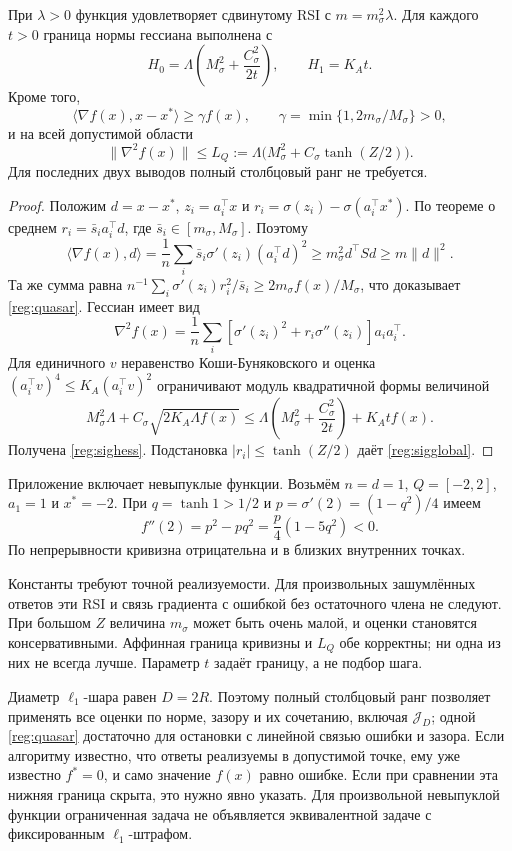 \begin{proposition}
\label{reg:sigmoidbounds}
При $\lambda>0$ функция удовлетворяет сдвинутому RSI с
$m=m_\sigma^2\lambda$. Для каждого $t>0$ граница нормы гессиана
выполнена с
\begin{equation}\label{reg:sighess}
 H_0=\Lambda\left(M_\sigma^2+\frac{C_\sigma^2}{2t}\right),
 \qquad H_1=K_A t.
\end{equation}
Кроме того,
\begin{equation}\label{reg:quasar}
 \langle\nabla f(x),x-x^*\rangle\ge\gamma f(x),\qquad
 \gamma=\min\{1,2m_\sigma/M_\sigma\}>0,
\end{equation}
и на всей допустимой области
\begin{equation}\label{reg:sigglobal}
 \|\nabla^2f(x)\|\le L_Q
 :=\Lambda\bigl(M_\sigma^2+C_\sigma\tanh(Z/2)\bigr).
\end{equation}
Для последних двух выводов полный столбцовый ранг не требуется.
\end{proposition}
\begin{proof}
Положим $d=x-x^*$, $z_i=a_i^\top x$ и
$r_i=\sigma(z_i)-\sigma(a_i^\top x^*)$.
По теореме о среднем $r_i=\bar s_i a_i^\top d$, где
$\bar s_i\in[m_\sigma,M_\sigma]$. Поэтому
\[
 \langle\nabla f(x),d\rangle
 =\frac1n\sum_i\bar s_i\sigma'(z_i)(a_i^\top d)^2
 \ge m_\sigma^2d^\top Sd\ge m\|d\|^2.
\]
Та же сумма равна
$n^{-1}\sum_i\sigma'(z_i)r_i^2/\bar s_i
 \ge 2m_\sigma f(x)/M_\sigma$, что доказывает \eqref{reg:quasar}.
Гессиан имеет вид
\[
 \nabla^2f(x)=\frac1n\sum_i
 [\sigma'(z_i)^2+r_i\sigma''(z_i)]a_i a_i^\top.
\]
Для единичного $v$ неравенство Коши-Буняковского и оценка
$(a_i^\top v)^4\le K_A(a_i^\top v)^2$ ограничивают модуль
квадратичной формы величиной
\[
 M_\sigma^2\Lambda+C_\sigma\sqrt{2K_A\Lambda f(x)}
 \le\Lambda\left(M_\sigma^2+\frac{C_\sigma^2}{2t}\right)+K_Atf(x).
\]
Получена \eqref{reg:sighess}. Подстановка
$|r_i|\le\tanh(Z/2)$ даёт \eqref{reg:sigglobal}.
\end{proof}

Приложение включает невыпуклые функции. Возьмём $n=d=1$,
$Q=[-2,2]$, $a_1=1$ и $x^*=-2$. При
$q=\tanh1>1/2$ и $p=\sigma'(2)=(1-q^2)/4$ имеем
\[
 f''(2)=p^2-pq^2=\frac p4(1-5q^2)<0.
\]
По непрерывности кривизна отрицательна и в близких внутренних точках.

Константы требуют точной реализуемости. Для произвольных зашумлённых
ответов эти RSI и связь градиента с ошибкой без остаточного члена
не следуют. При большом $Z$ величина $m_\sigma$ может быть очень
малой, и оценки становятся консервативными. Аффинная граница
кривизны и $L_Q$ обе корректны; ни одна из них не всегда лучше.
Параметр $t$ задаёт границу, а не подбор шага.

Диаметр $\ell_1$-шара равен $D=2R$. Поэтому полный столбцовый ранг
позволяет применять все оценки по норме, зазору и их сочетанию,
включая $\mathcal J_D$; одной \eqref{reg:quasar} достаточно для
остановки с линейной связью ошибки и зазора. Если алгоритму известно,
что ответы реализуемы в допустимой точке, ему уже известно $f^*=0$,
и само значение $f(x)$ равно ошибке. Если при сравнении эта
нижняя граница скрыта, это нужно явно указать. Для произвольной
невыпуклой функции ограниченная задача не объявляется эквивалентной
задаче с фиксированным $\ell_1$-штрафом.
